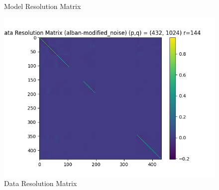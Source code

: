 \documentclass{article}
\begin{document}
\begin{itemize}
\begin{figure}[h]
        \caption{Model Resolution Matrix}
    \end{figure}
    \begin{figure}[h]
        \centering
        \includegraphics[width=1\textwidth]{images/outputs/datares/alban-modified_noise.png}
        \caption{Data Resolution Matrix}
    \end{figure}
    \clearpage



\end{itemize}
\end{document}
